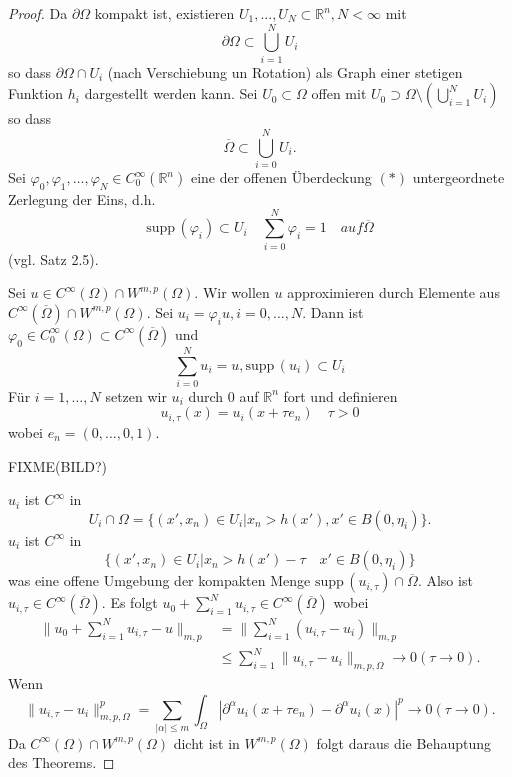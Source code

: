 \documentclass[
paper=a4,
bibtotocnumbered,
liststotocnumbered,
tablecaptionabove,
pointlessnumbers,
twoside,
openright,
10pt
]
{report}
\newcommand{\supp}{\mathrm{supp}\,}
\let\phi\varphi
\theoremstyle{definition}
\numberwithin{equation}{chapter}
\begin{document}
\begin{proof}
Da $\partial \Omega$ kompakt ist, existieren $U_1,..., U_N \subset \mathbb R^n, N<\infty$ mit
\begin{equation}
 \partial \Omega \subset \bigcup_{i=1}^N U_i
\end{equation}
so dass $\partial\Omega \cap U_i$ (nach Verschiebung un Rotation) als Graph einer stetigen Funktion $h_i$ dargestellt werden kann. Sei $U_0\subset \Omega$ offen mit $U_0\supset \Omega \setminus (\bigcup_{i=1}^N U_i)$ so dass
\begin{equation}\label{3.9kompakt}
 \overline{\Omega} \subset \bigcup_{i=0}^N U_i.
\end{equation}
Sei $\phi_0, \phi_1,\ldots, \phi_N \in C_0^\infty(\mathbb R^n)$ eine der offenen Überdeckung $(*)$ untergeordnete Zerlegung der Eins, d.h.
\begin{equation}
 \supp(\phi_i) \subset U_i \quad \sum_{i=0}^N \phi_i =1 \quad{auf } \overline{\Omega}
\end{equation}
(vgl. Satz 2.5).

Sei $u\in C^\infty(\Omega) \cap W^{m,p}(\Omega)$. Wir wollen $u$ approximieren durch Elemente aus $C^\infty(\overline{\Omega})\cap W^{m,p}(\Omega)$.  Sei $u_i = \phi_i u, i=0,\ldots, N$.  Dann ist $\phi_0 \in C_0^\infty(\Omega) \subset C^\infty(\overline{\Omega})$ und 
\begin{equation}
 \sum_{i=0}^N u_i = u, \supp(u_i) \subset U_i
\end{equation}
Für $i=1,\ldots, N$ setzen wir $u_i$ durch $0$ auf $\mathbb R^n$ fort und definieren
\begin{equation}
 u_{i,\tau}(x) =u_i(x+ \tau e_n) \quad \tau >0
\end{equation}
wobei $e_n=(0,\ldots,0,1)$.

FIXME(BILD?)

$u_i$ ist $C^\infty$ in 
\begin{equation}
U_i \cap \Omega = \{(x', x_n) \in U_i | x_n > h(x'), x' \in B(0,\eta_i)\}.
\end{equation} 
$u_i$ ist $C^\infty$ in 
\begin{equation}
 \{(x', x_n) \in U_i | x_n > h(x') - \tau \quad x'\in B(0,\eta_i)\}
\end{equation}
was eine offene Umgebung der kompakten Menge $\supp(u_{i,\tau}) \cap \overline{\Omega}$. Also ist $u_{i,\tau}\in C^\infty(\overline{\Omega})$. Es folgt $u_0 + \sum_{i=1}^N u_{i,\tau} \in C^\infty(\overline{\Omega})$ wobei
\begin{align*}
 \| u_0 + \sum_{i=1}^N u_{i,\tau} -u\|_{m,p} &= \| \sum_{i=1}^N (u_{i,\tau} - u_i)\|_{m,p}\\
 &\le \sum_{i=1}^N \| u_{i,\tau} - u_i \|_{m,p, \Omega} \to 0 (\tau \to 0).
\end{align*}
Wenn
\begin{equation}
 \| u_{i,\tau} - u_i \|^p_{m,p, \Omega} = \sum_{|\alpha|\le m} \int_\Omega | \partial^\alpha u_i (x+ \tau e_n) - \partial^\alpha u_i (x)|^p \to 0 (\tau \to 0). 
\end{equation}
Da $C^\infty(\Omega) \cap W^{m,p}(\Omega)$ dicht ist in $W^{m,p}(\Omega)$ folgt daraus die Behauptung des Theorems.
\end{proof}
\end{document}
